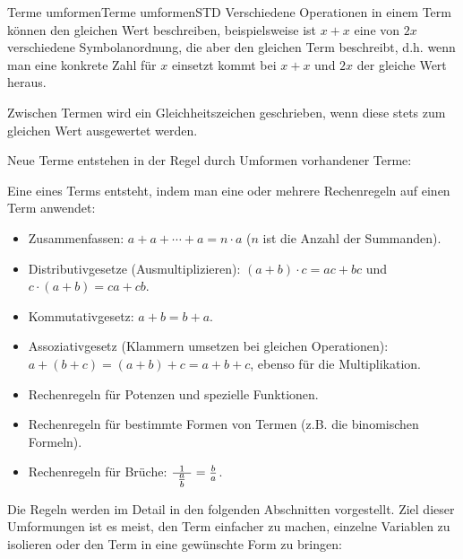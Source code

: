 \begin{MXContent}{Terme umformen}{Terme umformen}{STD}
Verschiedene Operationen in einem Term können den gleichen Wert beschreiben, beispielsweise ist $x+x$ eine von $2x$
verschiedene Symbolanordnung, die aber den gleichen Term beschreibt, d.h. wenn man eine konkrete Zahl für $x$ einsetzt
kommt bei $x+x$ und $2x$ der gleiche Wert heraus.

\begin{MInfo}
Zwischen Termen wird ein Gleichheitszeichen geschrieben, wenn diese stets zum gleichen Wert ausgewertet werden.
\end{MInfo}

Neue Terme entstehen in der Regel durch Umformen vorhandener Terme:

\begin{MInfo}
Eine  eines Terms entsteht, indem man eine oder mehrere Rechenregeln auf einen Term anwendet:
\begin{itemize}
\item{Zusammenfassen: $a+a+\cdots+a=n\cdot a$ ($n$ ist die Anzahl der Summanden).}
\item{Distributivgesetze (\glqq Ausmultiplizieren\grqq): $(a+b)\cdot c = a c+b c$ und $c\cdot(a+b)=c a+c b$.}
\item{Kommutativgesetz: $a+b=b+a$.}
\item{Assoziativgesetz (\glqq Klammern umsetzen bei gleichen Operationen\grqq): $a+(b+c)=(a+b)+c=a+b+c$, ebenso für die Multiplikation.}
\item{Rechenregeln für Potenzen und spezielle Funktionen.}
\item{Rechenregeln für bestimmte Formen von Termen (z.B. die binomischen Formeln).}
\item{Rechenregeln für Brüche: $\tfrac{1}{\phantom{2}\tfrac{a}{b}\phantom{2}}=\tfrac{b}{a}$.}
\end{itemize}
\end{MInfo}

Die Regeln werden im Detail in den folgenden Abschnitten vorgestellt.
Ziel dieser Umformungen ist es meist,
den Term einfacher zu machen, einzelne Variablen zu isolieren oder
den Term in eine gewünschte Form zu bringen:


\end{MXContent}
